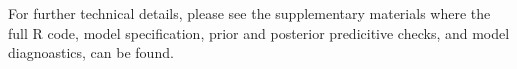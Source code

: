 \documentclass[9pt,twocolumn,twoside,lineno]{pnas-new}
\begin{document}
For further technical details, please see the supplementary materials where the full R code, model specification, prior and posterior predicitive checks, and model diagnoastics, can be found. 




\showmatmethods{} %


\showacknow{} %

 

\end{document}

